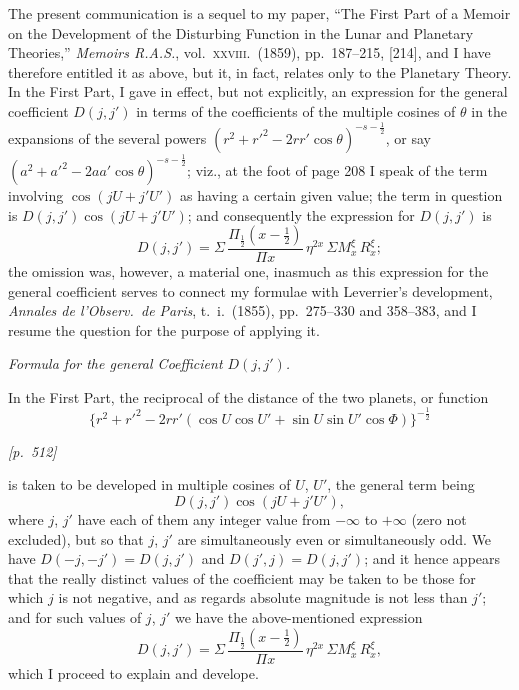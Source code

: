 \documentclass[11pt]{article}
\begin{document}
The present communication is a sequel to my paper, ``The First Part of
a Memoir on the Development of the Disturbing Function in the Lunar
and Planetary Theories,'' \textit{Memoirs R.A.S.}, vol.~\textsc{xxviii}.\ (1859),
pp.~187--215, [214], and I have therefore entitled it as above, but
it, in fact, relates only to the Planetary Theory. In the First Part,
I gave in effect, but not explicitly, an expression for the general
coefficient $D(j,j')$ in terms of the coefficients of the multiple
cosines of $\theta$ in the expansions of the several powers
$(r^{2}+r'^{2}-2rr'\cos\theta)^{-s-\tfrac{1}{2}}$, or say
$(a^{2}+a'^{2}-2aa'\cos\theta)^{-s-\tfrac{1}{2}}$; viz., at the foot of
page 208 I speak of the term involving $\cos(jU+j'U')$ as having a
certain given value; the term in question is $D(j,j')\cos(jU+j'U')$;
and consequently the expression for $D(j,j')$ is
\[
D(j,j')=\Sigma\,\frac{\Pi_{\tfrac{1}{2}}(x-\tfrac{1}{2})}{\Pi x}\,\eta^{2x}\,\Sigma M_{x}^{\xi}\,R_{x}^{\xi};
\]
the omission was, however, a material one, inasmuch as this expression
for the general coefficient serves to connect my formulae with
Leverrier's development, \textit{Annales de l'Observ.\ de Paris}, t.~i.\
(1855), pp.~275--330 and 358--383, and I resume the question for the
purpose of applying it.

\medskip

\begin{center}\textit{Formula for the general Coefficient $D(j,j')$.}\end{center}

\medskip

In the First Part, the reciprocal of the distance of the two planets,
or function
\[
\{r^{2}+r'^{2}-2rr'(\cos U\cos U'+\sin U\sin U'\cos\Phi)\}^{-\tfrac{1}{2}}
\]

\medskip

\noindent\textit{[p.~512]}

\medskip

\noindent
is taken to be developed in multiple cosines of $U$, $U'$, the general
term being
\[
D(j,j')\cos(jU+j'U'),
\]
where $j$, $j'$ have each of them any integer value from $-\infty$ to
$+\infty$ (zero not excluded), but so that $j$, $j'$ are simultaneously
even or simultaneously odd. We have $D(-j,-j')=D(j,j')$ and
$D(j',j)=D(j,j')$; and it hence appears that the really distinct values
of the coefficient may be taken to be those for which $j$ is not
negative, and as regards absolute magnitude is not less than $j'$; and
for such values of $j$, $j'$ we have the above-mentioned expression
\[
D(j,j')=\Sigma\,\frac{\Pi_{\tfrac{1}{2}}(x-\tfrac{1}{2})}{\Pi x}\,\eta^{2x}\,\Sigma M_{x}^{\xi}\,R_{x}^{\xi},
\]
which I proceed to explain and develope.
\end{document}
